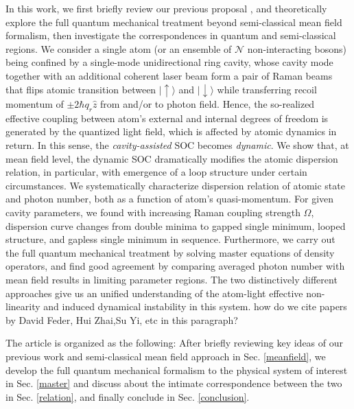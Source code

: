 \documentclass[atoms,article,submit,moreauthors,pdftex,12pt,a4paper]{mdpi}
\begin{document}
In this work, we first briefly review our previous proposal \cite{cavitySOC}, and theoretically explore the full quantum mechanical treatment beyond semi-classical mean field formalism, then investigate the correspondences in quantum and semi-classical regions. We consider a single atom (or an ensemble of $\mathcal{N}$ non-interacting  bosons) being confined by a single-mode unidirectional ring cavity, whose cavity mode together with an additional coherent laser beam form a pair of Raman beams that flips atomic transition between $|\uparrow\rangle$ and $|\downarrow\rangle$ while transferring recoil momentum of $\pm2\hbar q_r\hat{z}$ from and/or to photon field. Hence, the so-realized effective coupling between atom's external and internal degrees of freedom is generated by the quantized light field, which is affected by atomic dynamics in return. In this sense, the {\em cavity-assisted} SOC becomes {\em dynamic}. We show that, at mean field level, the dynamic SOC dramatically modifies the atomic dispersion relation, in particular, with emergence of a loop structure under certain circumstances. We systematically characterize dispersion relation of atomic state and photon number, both as a function of atom's quasi-momentum. For given cavity parameters, we found with increasing Raman coupling strength $\Omega$, dispersion curve changes from double minima to gapped single minimum, looped structure, and gapless single minimum in sequence. Furthermore, we carry out the full quantum mechanical treatment by solving master equations of density operators, and find good agreement by comparing averaged photon number with mean field results in limiting parameter regions. The two distinctively different approaches give us an unified understanding of the atom-light effective non-linearity and induced dynamical instability in this system. {\color{red} how do we cite papers by David Feder, Hui Zhai,Su Yi, etc in this paragraph?}

The article is organized as the following: After briefly reviewing key ideas of our previous work and semi-classical mean field approach in Sec. \ref{meanfield}, we develop the full quantum mechanical formalism to the physical system of interest in Sec. \ref{master} and discuss about the intimate correspondence between the two in Sec. \ref{relation}, and finally conclude in Sec. \ref{conclusion}. 
\end{document}
